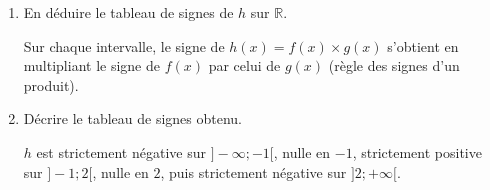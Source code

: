 \documentclass[10pt,a4paper]{article}
\begin{document}
\begin{sujets}
\begin{enumerate}
\begin{center}
\begin{minipage}{0.48\linewidth}
\(f\) a pour coefficient directeur \(a=-3<0\) : \(f\) est décroissante.
\[
\begin{aligned}
f(x)&>0\\
-3x+6&>0 &\scriptstyle(-6)\\
-3x&>-6 &\scriptstyle(\div(-3))\\
x&<2.
\end{aligned}
\]
\end{minipage}
\hfill
\begin{minipage}{0.48\linewidth}
\(g\) a pour coefficient directeur \(a=1>0\) : \(g\) est croissante.
\[
\begin{aligned}
g(x)&>0\\
x+1&>0 &\scriptstyle(-1)\\
x&>-1.
\end{aligned}
\]
\end{minipage}
\end{center}

\item En déduire le tableau de signes de \(h\) sur \(\mathbb{R}\).

Sur chaque intervalle, le signe de \(h(x)=f(x)\times g(x)\) s'obtient en multipliant le signe de \(f(x)\) par celui de \(g(x)\) (règle des signes d'un produit).

\begin{center}
\end{center}

\item Décrire le tableau de signes obtenu.

\(h\) est strictement négative sur \(]-\infty;-1[\), nulle en \(-1\), strictement positive sur \(]-1;2[\), nulle en \(2\), puis strictement négative sur \(]2;+\infty[\).
\end{enumerate}

\end{sujets}

\newpage

\end{document}
